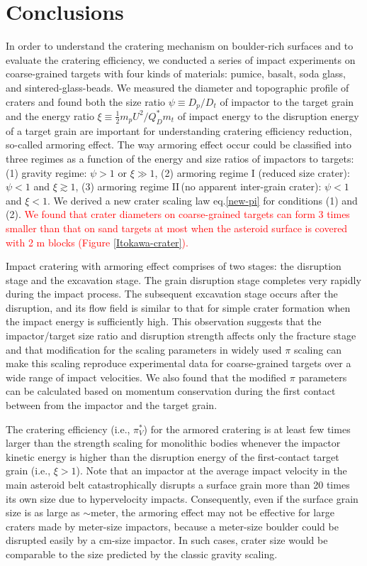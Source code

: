 \documentclass[3p,authoryear]{elsarticle}
\newcommand{\red}[1]{\textcolor{red}{#1}}
\newcommand{\II}{I\hspace{-.1 em}I}
\begin{document}
 \section{Conclusions}\label{sec:conclusion}
In order to understand the cratering mechanism on boulder-rich surfaces and to evaluate the cratering efficiency, we conducted a series of impact experiments on coarse-grained targets with four kinds of materials: pumice, basalt, soda glass, and sintered-glass-beads.
We measured the diameter and topographic profile of craters and found both the size ratio $\psi\equiv D_p/D_t$ of impactor to the target grain and the energy ratio $\xi\equiv \frac{1}{2}m_pU^2/Q_D^*m_t$ of impact energy to the disruption energy of a target grain are important for understanding cratering efficiency reduction, so-called armoring effect.
The way armoring effect occur could be classified into three regimes as a function of the energy and size ratios of impactors to targets: (1) gravity regime: $\psi>1$ or $\xi\gg 1$, (2) armoring regime I (reduced size crater): $\psi<1$ and $\xi\gtrsim 1$, (3) armoring regime \II\,(no apparent inter-grain crater): $\psi<1$ and $\xi<1$.
We derived a new crater scaling law eq.\eqref{new-pi} for conditions (1) and (2).
\red{We found that crater diameters on coarse-grained targets can form 3 times smaller than that on sand targets at most when the asteroid surface is covered with 2 m blocks (Figure \ref{Itokawa-crater}).}

Impact cratering with armoring effect comprises of two stages: the disruption stage and the excavation stage.
The grain disruption stage completes very rapidly during the impact process.
The subsequent excavation stage occurs after the disruption, and its flow field is similar to that for simple crater formation when the impact energy is sufficiently high.
This observation suggests that the impactor/target size ratio and disruption strength affects only the fracture stage and that modification for the scaling parameters in widely used $\pi$ scaling \citep[e.g.,][]{holsapple1993} can make this scaling reproduce experimental data for coarse-grained targets over a wide range of impact velocities.
We also found that the modified $\pi$ parameters can be calculated based on momentum conservation during the first contact between from the impactor and the target grain.

The cratering efficiency (i.e., $\pi_V^*$) for the armored cratering is at least few times larger than the strength scaling for monolithic bodies whenever the impactor kinetic energy is higher than the disruption energy of the first-contact target grain (i.e., $\xi>1$). Note that an impactor at the average impact velocity in the main asteroid belt catastrophically disrupts a surface grain more than 20 times its own size due to hypervelocity impacts. Consequently, even if the surface grain size is as large as $\sim$meter, the armoring effect may not be effective for large craters made by meter-size impactors, because a meter-size boulder could be disrupted easily by a cm-size impactor. In such cases, crater size would be comparable to the size predicted by the classic gravity scaling.
\end{document}
